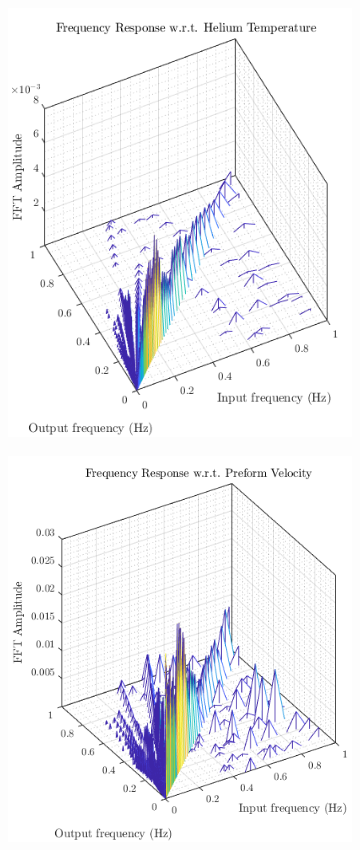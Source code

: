 \begin{figure}[hp]
    \begin{subfigure}[b]{0.49\textwidth}
        \centering
        \includegraphics[width=\textwidth]{figures/bode_3d_3.png}
    \end{subfigure}
    \hfill
    \begin{subfigure}[b]{0.49\textwidth}
        \centering
        \includegraphics[width=\textwidth]{figures/bode_3d_4.png}
    \end{subfigure}
    

\end{figure}
